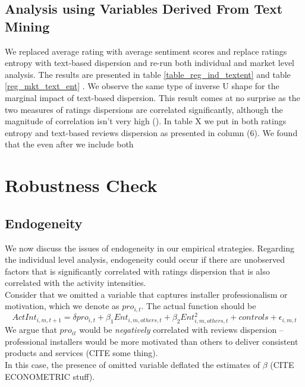 \documentclass[msom,blindrev]{informs3}
\begin{document}
\subsection{Analysis using Variables Derived From Text Mining} 




We replaced average rating with average sentiment scores and replace ratings entropy with text-based dispersion and re-run both individual and market level analysis. The results are presented in table \ref{table_reg_ind_textent} and table \ref{reg_mkt_text_ent} . We observe the same type of inverse U shape for the marginal impact of text-based dispersion. This result comes at no surprise as the two measures of ratings dispersions are correlated significantly, although the magnitude of correlation isn't very high (). In table X we put in both ratings entropy and text-based reviews dispersion as presented in column (6). We found that the even after we include both  \\



\section{Robustness Check}
\subsection{Endogeneity}
We now discuss the issues of endogeneity in our empirical strategies. Regarding the individual level analysis, endogeneity could occur if there are unobserved factors that is significantly correlated with ratings dispersion that is also correlated with the activity intensities.\\
Consider that we omitted a variable that captures installer professionalism or motivation, which we denote as $pro_{i,t}$. The actual function should be
\begin{equation}
ActInt_{i,m,t+1}=\delta pro_{i,t}+\beta_{1} Ent_{i,m,others,t}+\beta_{2}Ent_{i,m,others,t}^2+controls+\epsilon_{i,m,t}
\end{equation}
We argue that $pro_{it}$ would be \textit{negatively} correlated with reviews dispersion -- professional installers would be more motivated than others to deliver consistent products and services (CITE some thing).  \\

In this case, the presence of omitted variable deflated the estimates of $\beta$ (CITE ECONOMETRIC stuff). \\
\end{document}

